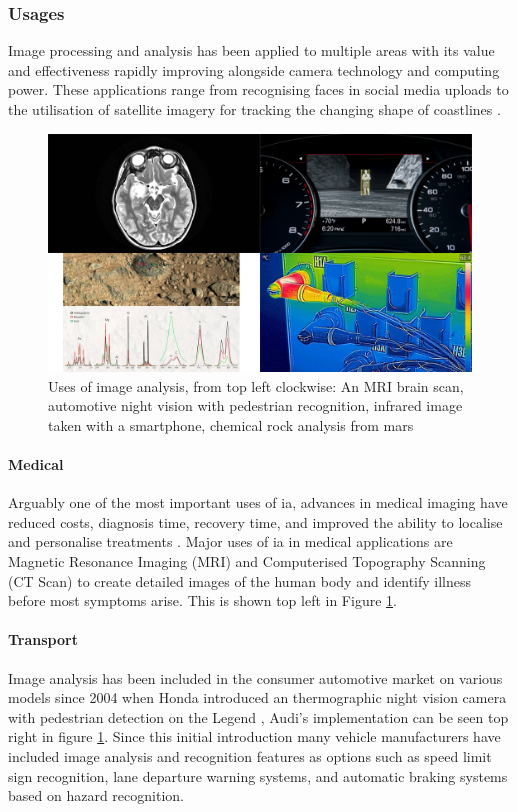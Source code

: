 	\subsubsection{Usages}
	Image processing and analysis has been applied to multiple areas with its value and 
	effectiveness rapidly improving alongside camera technology and computing power. These 
	applications range from recognising faces in social media uploads \citep{zuckerberg2011tagging} 
	to the utilisation of satellite imagery for tracking the changing shape of coastlines 
	\citep{costalimagery}.
	\begin{figure}[h!]
		\centering
		\includegraphics[width=15cm]{../images/4panel.png}
		\caption[Uses of image analysis]{Uses of image analysis, from top left clockwise: An MRI brain scan, automotive 
		night vision with pedestrian recognition, infrared image taken with a smartphone, chemical 
		rock analysis from 
			mars}
		\label{fig:analysis_uses}
	\end{figure}
	\paragraph{Medical}
	Arguably one of the most important uses of \gls{ia}, advances in medical imaging have reduced costs, diagnosis time, recovery time, and improved the ability to localise and personalise treatments \citep{esfmedical}. Major uses of \gls{ia} in medical applications are Magnetic Resonance Imaging (MRI) and Computerised Topography Scanning (CT Scan) to create detailed images of the human body and identify illness before most symptoms arise. This is shown top left in Figure \ref{fig:analysis_uses}.
	\paragraph{Transport}
	Image analysis has been included in the consumer automotive market on various models since 2004 when Honda introduced an thermographic night vision camera with pedestrian detection on the Legend  \citep{hondanightvision}, Audi's implementation can be seen top right in figure \ref{fig:analysis_uses}. Since this initial introduction many vehicle manufacturers have included image analysis and recognition features as options such as speed limit sign recognition, lane departure warning systems, and automatic braking systems based on hazard recognition.
